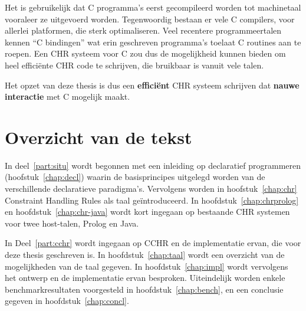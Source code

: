 Het is gebruikelijk dat C programma's eerst gecompileerd worden tot machinetaal vooraleer ze uitgevoerd worden. Tegenwoordig bestaan er vele C compilers, voor allerlei platformen, die sterk optimaliseren. Veel recentere programmeertalen kennen ``C bindingen'' wat erin geschreven programma's toelaat C routines aan te roepen. Een CHR systeem voor C zou dus de mogelijkheid kunnen bieden om heel effici\"ente CHR code te schrijven, die bruikbaar is vanuit vele talen.

Het opzet van deze thesis is dus een {\bf effici\"ent} CHR systeem schrijven dat {\bf nauwe interactie} met C mogelijk maakt.

\section{Overzicht van de tekst}

In deel~\ref{part:situ} wordt begonnen met een inleiding op declaratief programmeren (hoofstuk~\ref{chap:decl}) waarin de basisprincipes uitgelegd worden van de verschillende declaratieve paradigma's. Vervolgens worden in hoofstuk~\ref{chap:chr} Constraint Handling Rules als taal ge\"introduceerd. In hoofdstuk~\ref{chap:chrprolog} en hoofdstuk~\ref{chap:chr-java} wordt kort ingegaan op bestaande CHR systemen voor twee host-talen, Prolog en Java.

In Deel~\ref{part:cchr} wordt ingegaan op CCHR en de implementatie ervan, die voor deze thesis geschreven is. In hoofdstuk~\ref{chap:taal} wordt een overzicht van de mogelijkheden van de taal gegeven. In hoofdstuk~\ref{chap:impl} wordt vervolgens het ontwerp en de implementatie ervan besproken. Uiteindelijk worden enkele benchmarkresultaten voorgesteld in hoofdstuk~\ref{chap:bench}, en een conclusie gegeven in hoofdstuk~\ref{chap:concl}.
